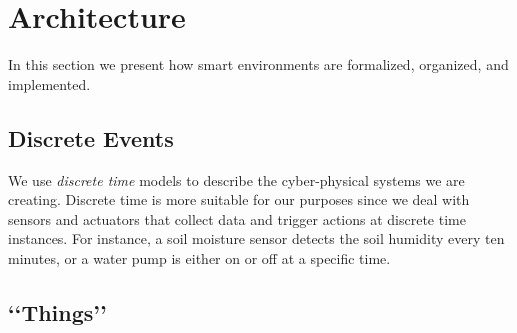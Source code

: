 \section{Architecture}

In this section we present how smart environments are formalized, organized, and implemented.



\subsection{Discrete Events}

We use \emph{discrete time} models to describe the cyber-physical systems we are creating.\cite{Lee1999} Discrete time is more suitable for our purposes since we deal with sensors and actuators that collect data and trigger actions at discrete time instances. For instance, a soil moisture sensor detects the soil humidity every ten minutes, or a water pump is either on or off at a specific time.

\subsection{\lq\lq Things\rq\rq}

